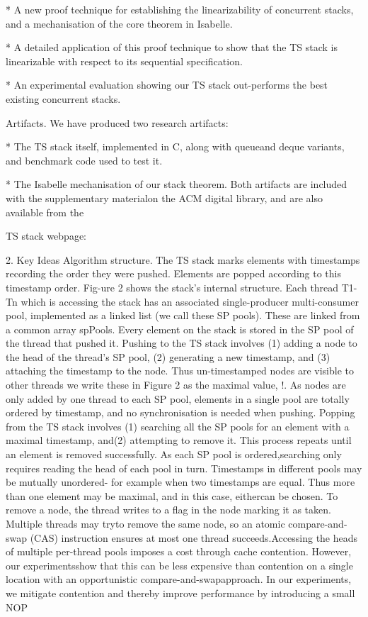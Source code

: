 * A new proof technique for establishing the linearizability of concurrent
stacks, and a mechanisation of the core theorem in Isabelle.

* A detailed application of this proof technique to show that the TS stack is
linearizable with respect to its sequential specification.

* An experimental evaluation showing our TS stack out-performs the best existing
concurrent stacks.

Artifacts. We have produced two research artifacts:

* The TS stack itself, implemented in C, along with queueand deque variants,
and benchmark code used to test it.

* The Isabelle mechanisation of our stack theorem.
Both artifacts are included with the supplementary materialon the ACM digital
library, and are also available from the

TS stack webpage:

2. Key Ideas
Algorithm structure. 
The TS stack marks elements with timestamps recording the order they were
pushed.
Elements are popped according to this timestamp order.
Fig-ure 2 shows the stack's internal structure. 
Each thread T1-Tn which is accessing the stack has an associated
single-producer multi-consumer pool, implemented as a linked list (we call
these SP pools).
These are linked from a common array spPools. 
Every element on the stack is stored in the SP pool of the thread that pushed
it.
Pushing to the TS stack involves (1) adding a node to the head of the thread's
SP pool, (2) generating a new timestamp, and (3) attaching the timestamp to the
node.
Thus un-timestamped nodes are visible to other threads we write these in Figure
2 as the maximal value, !. 
As nodes are only added by one thread to each SP pool, elements in a single pool
are totally ordered by timestamp, and no synchronisation is needed when
pushing.
Popping from the TS stack involves (1) searching all the SP pools for an
element with a maximal timestamp, and(2) attempting to remove it. 
This process repeats until an element is removed successfully. 
As each SP pool
is ordered,searching only requires reading the head of each pool in turn.
Timestamps in different pools may be mutually unordered- for example when two timestamps are equal. Thus more
than one element may be maximal, and in this case, eithercan be chosen. To remove a node, the thread writes to a flag
in the node marking it as taken. Multiple threads may tryto remove the same node, so an atomic compare-and-swap
(CAS) instruction ensures at most one thread succeeds.Accessing the heads of multiple per-thread pools imposes
a cost through cache contention. However, our experimentsshow that this can be less expensive than contention on
a single location with an opportunistic compare-and-swapapproach. In our experiments, we mitigate contention and
thereby improve performance by introducing a small NOP

